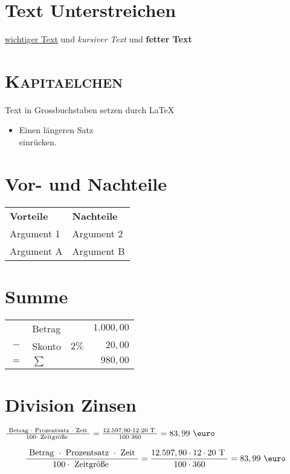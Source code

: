 \section{\textbf{Text Unterstreichen}}
    \underline{wichtiger Text} und \emph{kursiver Text} und \textbf{fetter Text}

 
\section{\textsc{Kapitaelchen}}  
    Text in Grossbuchstaben setzen durch \LaTeX
    \begin{itemize} %
        \item[] Einen längeren Satz\\ einrücken.
    \end{itemize}

\section{Vor- und Nachteile}
    \begin{tabular}[h]{ll}
        {\textbf{Vorteile}}   &  {\textbf{Nachteile}} \\
        Argument 1            &  Argument 2 \\
        Argument A            &  Argument B \\
    \end{tabular} 

\section{Summe}
    \begin{tabular}[h]{clrr}
        & Betrag &               &  $1.000,00$ \\
    $-$ & Skonto & $2\%$         &     $20,00$ \\
        \hline
    $=$ & $\sum$ &               &    $980,00$  
    \end{tabular} 
    
\section{Division Zinsen}
    $
        \frac{\text{ Betrag } \cdot \text{ Prozentsatz } \cdot \text{ Zeit } }{100 \cdot \text{ Zeitgröße }} 
        = \frac{12.597,90 \cdot 12 \cdot 20 \text{ T } }{100 \cdot 360} 
        = 83,99 \text{ \euro }
    $

    \begin{align*}
        \frac{\text{ Betrag } \cdot \text{ Prozentsatz } \cdot \text{ Zeit } }{100 \cdot \text{ Zeitgröße }} 
        = \frac{12.597,90 \cdot 12 \cdot 20 \text{ T } }{100 \cdot 360} 
        = 83,99 \text{ \euro }
    \end{align*} 

